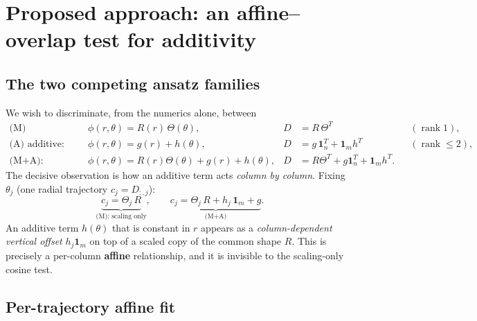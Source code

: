 \documentclass{article}
\begin{document}
\section{Proposed approach: an affine--overlap test for additivity}

\subsection{The two competing ansatz families}

We wish to discriminate, from the numerics alone, between
\begin{align}
\text{(M) multiplicative:}\quad & \phi(r,\theta)=R(r)\,\Theta(\theta),
& D&=R\,\Theta^{T} && (\operatorname{rank}1),\\
\text{(A) additive:}\quad & \phi(r,\theta)=g(r)+h(\theta),
& D&=g\,\mathbf 1_{n}^{T}+\mathbf 1_{m}h^{T} && (\operatorname{rank}\le2),\\
\text{(M+A):}\quad & \phi(r,\theta)=R(r)\Theta(\theta)+g(r)+h(\theta),
& D&=R\Theta^{T}+g\mathbf 1_{n}^{T}+\mathbf 1_{m}h^{T}. &&
\end{align}
The decisive observation is how an additive term acts \emph{column by column}.
Fixing $\theta_{j}$ (one radial trajectory $c_{j}=D_{:,j}$):
\begin{equation}
\underbrace{c_{j}=\Theta_{j}\,R}_{\text{(M): scaling only}},
\qquad
\underbrace{c_{j}=\Theta_{j}\,R+h_{j}\,\mathbf 1_{m}+g}_{\text{(M+A)}}.
\end{equation}
An additive term $h(\theta)$ that is constant in $r$ appears as a
\emph{column-dependent vertical offset} $h_{j}\mathbf 1_{m}$ on top of a scaled
copy of the common shape $R$. This is precisely a per-column \textbf{affine}
relationship, and it is invisible to the scaling-only cosine test.

\subsection{Per-trajectory affine fit}
\end{document}
